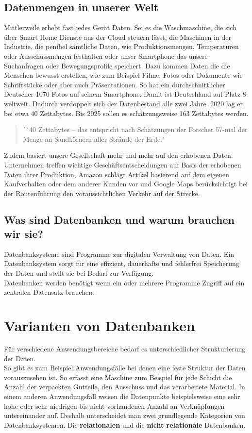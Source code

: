\documentclass[12pt, a4paper, twoside]{article}
\begin{document}
	\subsection{Datenmengen in unserer Welt}
		Mittlerweile erhebt fast jedes Gerät Daten. Sei es die Waschmaschine, die sich über Smart Home Dienste aus der Cloud steuern lässt, die Maschinen in der Industrie, die penibel sämtliche Daten, wie Produktionsmengen, Temperaturen oder Ausschussmengen festhalten oder unser Smartphone das unsere Suchanfragen oder Bewegungsprofile speichert. Dazu kommen Daten die die Menschen bewusst erstellen, wie zum Beispiel Filme, Fotos oder Dokumente wie Schriftstücke oder aber auch Präsentationen. 
		So hat ein durchschnittlicher Deutscher 1070 Fotos auf seinem Smartphone. Damit ist Deutschland auf Platz 8 weltweit.\cite{Fotos:Thiele}
		Dadurch verdoppelt sich der Datenbestand alle zwei Jahre. 2020 lag er bei etwa 40 Zettabytes. Bis 2025 sollen es schätzungsweise 163 Zettabytes werden.%
		\begin{quote}
			"`40 Zettabytes – das entspricht nach Schätzungen der Forscher 57-mal der Menge an Sandkörnern aller Strände der Erde." \cite{Datenvolumen:Juengling}
		\end{quote}
		Zudem basiert unsere Gesellschaft mehr und mehr auf den erhobenen Daten. Unternehmen treffen wichtige Geschäftsentscheidungen auf Basis der erhobenen Daten ihrer Produktion, Amazon schlägt Artikel basierend auf dem eigenen Kaufverhalten oder dem anderer Kunden vor und Google Maps berücksichtigt bei der Routenführung den voraussichtlichen Verkehr auf der Strecke.\cite{DataAge:Peinsel}
		
	\subsection{Was sind Datenbanken und warum brauchen wir sie?}
		Datenbanksysteme sind Programme zur digitalen Verwaltung von Daten. Ein Datenbanksystem sorgt für eine effizient, dauerhafte und fehlerfrei Speicherung der Daten und stellt sie bei Bedarf zur Verfügung. \\
		Datenbanken werden benötigt wenn ein oder mehrere Programme Zugriff auf ein zentralen Datensatz brauchen. 

\section{Varianten von Datenbanken}
	Für verschiedene Anwendungsbereiche bedarf es unterschiedlicher Strukturierung der Daten.\\
	So gibt es zum Beispiel Anwendungsfälle bei denen eine feste Struktur der Daten vorauszusehen ist. So erfasst eine Maschine zum Beispiel für jede Schicht die Anzahl der verpackten Gutteile, den Ausschuss und das verarbeitete Material. In einem anderen Anwendungsfall weisen die Datenpunkte beispielsweise eine sehr hohe oder sehr niedrigen bis nicht vorhandenen Anzahl an Verknüpfungen untereinander auf.
	Deshalb unterscheidet man zwei grundlegende Kategorien von Datenbanksystemen. Die \textbf{relationalen} und die \textbf{nicht relationale} Datenbanken.
\end{document}
